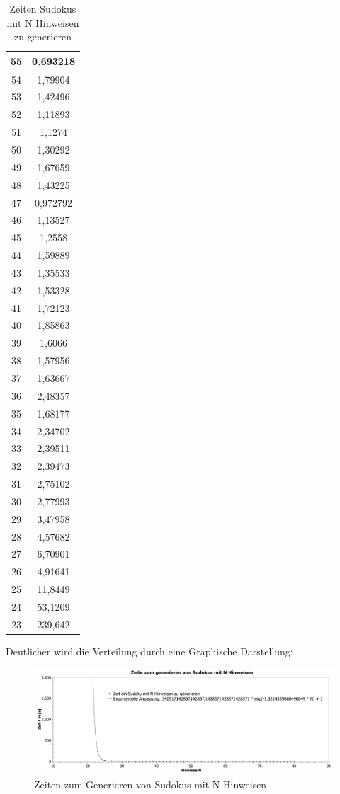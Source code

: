 \documentclass[11pt,a4paper]{article}
\begin{document}
\begin{table}[htbp!]
\begin{center}
\begin{tabular}{|*{2}{c|}}
 55 & 0,693218 \\ \hline 
 54 & 1,79904 \\ \hline 
 53 & 1,42496 \\ \hline 
 52 & 1,11893 \\ \hline 
 51 & 1,1274 \\ \hline 
 50 & 1,30292 \\ \hline 
 49 & 1,67659 \\ \hline 
 48 & 1,43225 \\ \hline 
 47 & 0,972792 \\ \hline 
 46 & 1,13527 \\ \hline 
 45 & 1,2558 \\ \hline 
 44 & 1,59889 \\ \hline 
 43 & 1,35533 \\ \hline 
 42 & 1,53328 \\ \hline 
 41 & 1,72123 \\ \hline 
 40 & 1,85863 \\ \hline 
 39 & 1,6066 \\ \hline 
 38 & 1,57956 \\ \hline 
 37 & 1,63667 \\ \hline 
 36 & 2,48357 \\ \hline 
 35 & 1,68177 \\ \hline 
 34 & 2,34702 \\ \hline 
 33 & 2,39511 \\ \hline 
 32 & 2,39473 \\ \hline 
 31 & 2,75102 \\ \hline 
 30 & 2,77993 \\ \hline 
 29 & 3,47958 \\ \hline 
 28 & 4,57682 \\ \hline 
 27 & 6,70901 \\ \hline 
 26 & 4,91641 \\ \hline 
 25 & 11,8449 \\ \hline 
 24 & 53,1209 \\ \hline 
 23 & 239,642 \\ \hline 
 \end{tabular}
 \end{center}
  \caption{Zeiten Sudokus mit N Hinweisen zu generieren } 
\end{table} 
Deutlicher wird die Verteilung durch eine Graphische Darstellung:
\newpage
\ \\
\begin{figure}[htbp!]
\begin{center}
\includegraphics[width=1\textwidth]{lasttest.pdf}
\end{center}
\caption{Zeiten zum Generieren von Sudokus mit N Hinweisen}
\end{figure}
\end{document}
